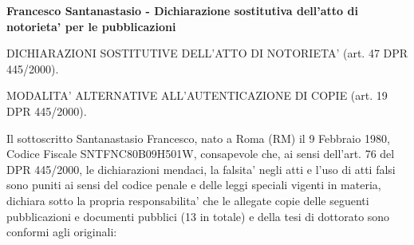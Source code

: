 \documentclass[10pt]{letter}
\begin{document}
{\large \sc \bf Francesco Santanastasio - Dichiarazione sostitutiva dell'atto di notorieta' per le pubblicazioni}

DICHIARAZIONI SOSTITUTIVE DELL'ATTO DI NOTORIETA' (art. 47 DPR 445/2000). 

MODALITA' ALTERNATIVE ALL'AUTENTICAZIONE DI COPIE (art. 19 DPR 445/2000). 

Il sottoscritto Santanastasio Francesco, 
nato a Roma (RM) il 9 Febbraio 1980, Codice Fiscale SNTFNC80B09H501W, consapevole che, ai sensi dell'art. 76 del DPR 445/2000, le dichiarazioni mendaci, 
la falsita' negli atti e l'uso di atti falsi sono puniti ai sensi del codice penale e delle leggi speciali vigenti 
in materia, dichiara sotto la propria responsabilita' che le allegate copie delle seguenti pubblicazioni e documenti 
pubblici (13 in totale) e della tesi di dottorato sono conformi agli originali: 


\end{document}
